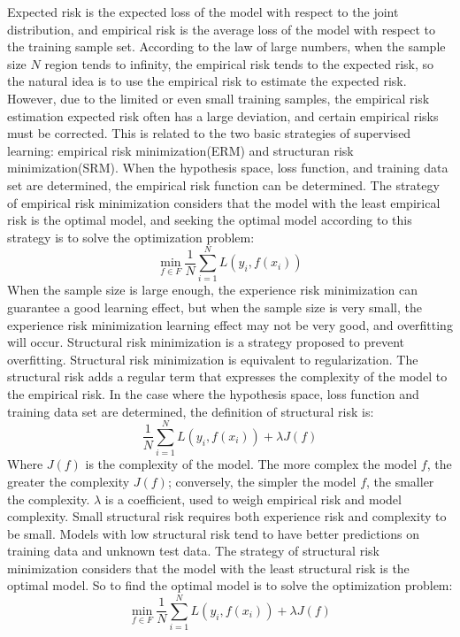 Expected risk is the expected loss of the model with respect to the joint distribution, and empirical risk is the average loss of the model with respect to the training sample set. According to the law of large numbers, when the sample size $N$ region tends to infinity, the empirical risk tends to the expected risk, so the natural idea is to use the empirical risk to estimate the expected risk. However, due to the limited or even small training samples, the empirical risk estimation expected risk often has a large deviation, and certain empirical risks must be corrected. This is related to the two basic strategies of supervised learning: empirical risk minimization(ERM) and structuran risk minimization(SRM).
When the hypothesis space, loss function, and training data set are determined, the empirical risk function can be determined. The strategy of empirical risk minimization considers that the model with the least empirical risk is the optimal model, and seeking the optimal model according to this strategy is to solve the optimization problem:
$$ \min\limits_{f\in F}\frac{1}{N}\sum_{i=1}^NL(y_i,f(x_i))$$
When the sample size is large enough, the experience risk minimization can guarantee a good learning effect, but when the sample size is very small, the experience risk minimization learning effect may not be very good, and overfitting will occur. Structural risk minimization is a strategy proposed to prevent overfitting. Structural risk minimization is equivalent to regularization. The structural risk adds a regular term that expresses the complexity of the model to the empirical risk. In the case where the hypothesis space, loss function and training data set are determined, the definition of structural risk is:
$$\frac{1}{N}\sum_{i=1}^NL(y_i,f(x_i))+\lambda J(f)$$
Where $J(f)$ is the complexity of the model. The more complex the model $f$, the greater the complexity $J(f)$; conversely, the simpler the model $f$, the smaller the complexity. $\lambda$ is a coefficient, used to weigh empirical risk and model complexity. Small structural risk requires both experience risk and complexity to be small. Models with low structural risk tend to have better predictions on training data and unknown test data. The strategy of structural risk minimization considers that the model with the least structural risk is the optimal model. So to find the optimal model is to solve the optimization problem:
$$\min\limits_{f\in F}\frac{1}{N}\sum_{i=1}^NL(y_i,f(x_i))+\lambda J(f)$$

